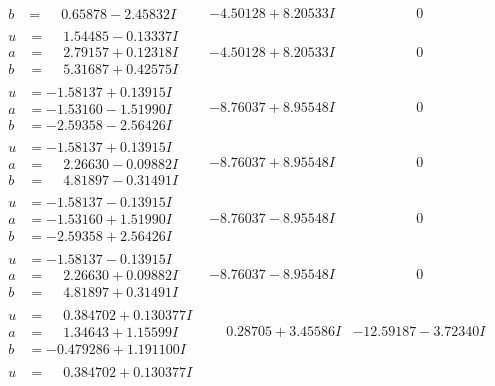 \documentclass[1p]{elsarticle_modified}
\theoremstyle{definition}
\begin{document}
$$\begin{array}{c|c|c}
\begin{aligned}
b &= \phantom{-}0.65878 - 2.45832 I\end{aligned}
 & -4.50128 + 8.20533 I & \phantom{-0.000000 } 0 \\ \hline\begin{aligned}
u &= \phantom{-}1.54485 - 0.13337 I \\
a &= \phantom{-}2.79157 + 0.12318 I \\
b &= \phantom{-}5.31687 + 0.42575 I\end{aligned}
 & -4.50128 + 8.20533 I & \phantom{-0.000000 } 0 \\ \hline\begin{aligned}
u &= -1.58137 + 0.13915 I \\
a &= -1.53160 - 1.51990 I \\
b &= -2.59358 - 2.56426 I\end{aligned}
 & -8.76037 + 8.95548 I & \phantom{-0.000000 } 0 \\ \hline\begin{aligned}
u &= -1.58137 + 0.13915 I \\
a &= \phantom{-}2.26630 - 0.09882 I \\
b &= \phantom{-}4.81897 - 0.31491 I\end{aligned}
 & -8.76037 + 8.95548 I & \phantom{-0.000000 } 0 \\ \hline\begin{aligned}
u &= -1.58137 - 0.13915 I \\
a &= -1.53160 + 1.51990 I \\
b &= -2.59358 + 2.56426 I\end{aligned}
 & -8.76037 - 8.95548 I & \phantom{-0.000000 } 0 \\ \hline\begin{aligned}
u &= -1.58137 - 0.13915 I \\
a &= \phantom{-}2.26630 + 0.09882 I \\
b &= \phantom{-}4.81897 + 0.31491 I\end{aligned}
 & -8.76037 - 8.95548 I & \phantom{-0.000000 } 0 \\ \hline\begin{aligned}
u &= \phantom{-}0.384702 + 0.130377 I \\
a &= \phantom{-}1.34643 + 1.15599 I \\
b &= -0.479286 + 1.191100 I\end{aligned}
 & \phantom{-}0.28705 + 3.45586 I & -12.59187 - 3.72340 I \\ \hline\begin{aligned}
u &= \phantom{-}0.384702 + 0.130377 I \\

\end{aligned}
\end{array}$$
\end{document}

